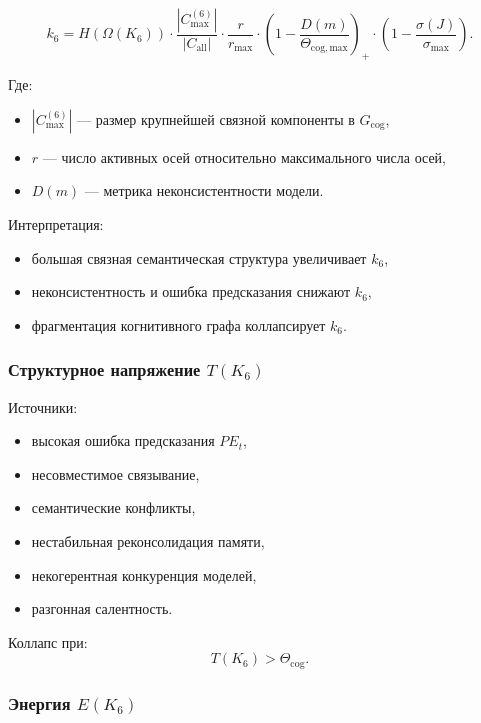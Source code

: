 \[
k_6
= H(\Omega(K_6))
  \cdot \frac{|C_{\max}^{(6)}|}{|C_{\mathrm{all}}|}
  \cdot \frac{r}{r_{\max}}
  \cdot \left(1 - \frac{D(m)}{\Theta_{\mathrm{cog,max}}}\right)_+
  \cdot \left(1-\frac{\sigma(J)}{\sigma_{\max}}\right).
\]

Где:
\begin{itemize}
    \item $|C_{\max}^{(6)}|$ — размер крупнейшей связной компоненты в
          $G_{\mathrm{cog}}$,
    \item $r$ — число активных осей относительно максимального числа осей,
    \item $D(m)$ — метрика неконсистентности модели.
\end{itemize}

Интерпретация:
\begin{itemize}
    \item большая связная семантическая структура увеличивает $k_6$,
    \item неконсистентность и ошибка предсказания снижают $k_6$,
    \item фрагментация когнитивного графа коллапсирует $k_6$.
\end{itemize}

\subsubsection{Структурное напряжение \texorpdfstring{$T(K_6)$}{T(K_6)}}

Источники:
\begin{itemize}
    \item высокая ошибка предсказания $PE_t$,
    \item несовместимое связывание,
    \item семантические конфликты,
    \item нестабильная реконсолидация памяти,
    \item некогерентная конкуренция моделей,
    \item разгонная салентность.
\end{itemize}

Коллапс при:
\[
T(K_6) > \Theta_{\mathrm{cog}}.
\]

\subsubsection{Энергия \texorpdfstring{$E(K_6)$}{E(K_6)}}

